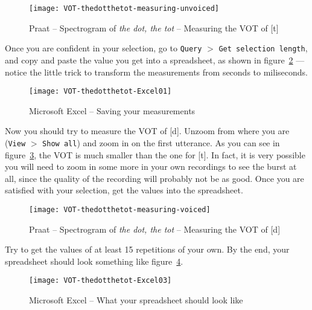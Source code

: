 \documentclass{article}
\newcommand{\soft}[1]{\textsf{#1}}
\newcommand{\softmenu}[1]{\texttt{#1}}
\newcommand{\MSExcel}{\soft{Microsoft\texttrademark{} Excel}}
\newcommand{\Praat}{\soft{Praat}}
\begin{document}
\begin{figure}[!tbp]
\caption{\Praat{} -- Spectrogram of \emph{the dot, the tot} -- Measuring the VOT of [t]}
\label{step3VOT}
	\begin{center}
		\texttt{[image: VOT-thedotthetot-measuring-unvoiced]}
	\end{center}
\end{figure}

Once you are confident in your selection, go to \softmenu{Query} $>$ \softmenu{Get selection length}, and copy and paste the value you get into a spreadsheet, as shown in figure~\ref{step4VOT} --- notice the little trick to transform the measurements from seconds to miliseconds.

\begin{figure}[!tbp]
\caption{\MSExcel{} -- Saving your measurements}
\label{step4VOT}
	\begin{center}
		\texttt{[image: VOT-thedotthetot-Excel01]}
	\end{center}
\end{figure}

Now you should try to measure the VOT of [d]. Unzoom from where you are (\softmenu{View} $>$ \softmenu{Show all}) and zoom in on the first utterance. As you can see in figure~\ref{step5VOT}, the VOT is much smaller than the one for [t]. In fact, it is very possible you will need to zoom in some more in your own recordings to see the burst at all, since the quality of the recording will probably not be as good. Once you are satisfied with your selection, get the values into the spreadsheet.

\begin{figure}[!tbp]
\caption{\Praat{} -- Spectrogram of \emph{the dot, the tot} -- Measuring the VOT of [d]}
\label{step5VOT}
	\begin{center}
		\texttt{[image: VOT-thedotthetot-measuring-voiced]}
	\end{center}
\end{figure}
 
Try to get the values of at least 15 repetitions of your own. By the end, your spreadsheet should look something like figure~\ref{step6VOT}.

\begin{figure}[!tbp]
\caption{\MSExcel{} -- What your spreadsheet should look like}
\label{step6VOT}
	\begin{center}
		\texttt{[image: VOT-thedotthetot-Excel03]}
	\end{center}
\end{figure}
\end{document}
